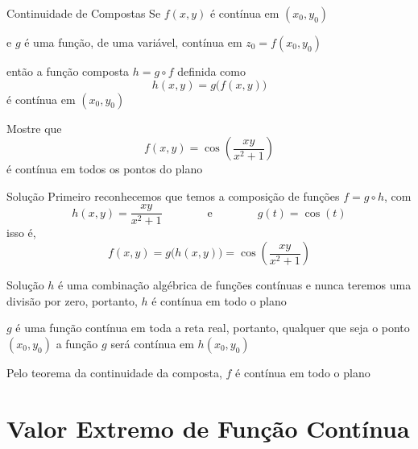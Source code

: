 \documentclass[fleqn,utf8,aspectratio=169,12pt]{beamer}
\begin{document}
\begin{frame}{Continuidade de Compostas}
  Se $f(x, y)$ é contínua em $(x_0, y_0)$

  \pause
  e $g$ é uma função, de uma variável, contínua em $z_0 = f(x_0, y_0)$

  \pause
  então a função composta
  \(
    h = g\circ f
  \)
  \pause
  definida como
  \[
    h(x, y) = g\big(f(x, y)\big)
  \]
  \pause
  é contínua em $(x_0, y_0)$
\end{frame}

\begin{question}
  Mostre que
  \[
    f(x, y) = \cos\left(\frac{xy}{x^2+1}\right)
  \]
  é contínua em todos os pontos do plano
\end{question}

\begin{resolution}{Solução}
  Primeiro reconhecemos que temos a composição de funções $f=g\circ h$,
  \pause
  com
  \[
    h(x, y) = \frac{xy}{x^2+1}
    \qquad\qquad\text{e}\qquad\qquad
    g(t) = \cos(t)
  \]
  \pause
  isso é,
  \[
    f(x, y) = g\big(h(x, y)\big) = \cos\left(\frac{xy}{x^2+1}\right)
  \]
\end{resolution}

\begin{resolution}{Solução}
  $h$ é uma combinação algébrica de funções contínuas e nunca teremos
  uma divisão por zero, portanto, $h$ é contínua em todo o plano

  \pause
  \vspace{\baselineskip}
  $g$ é uma função contínua em toda a reta real, portanto, qualquer que seja o ponto
  $(x_0, y_0)$ a função $g$ será contínua em $h(x_0, y_0  )$

  \pause
  \vspace{\baselineskip}
  Pelo teorema da continuidade da composta, $f$ é contínua em todo o plano
\end{resolution}

\section{Valor Extremo de Função Contínua}
\end{document}
